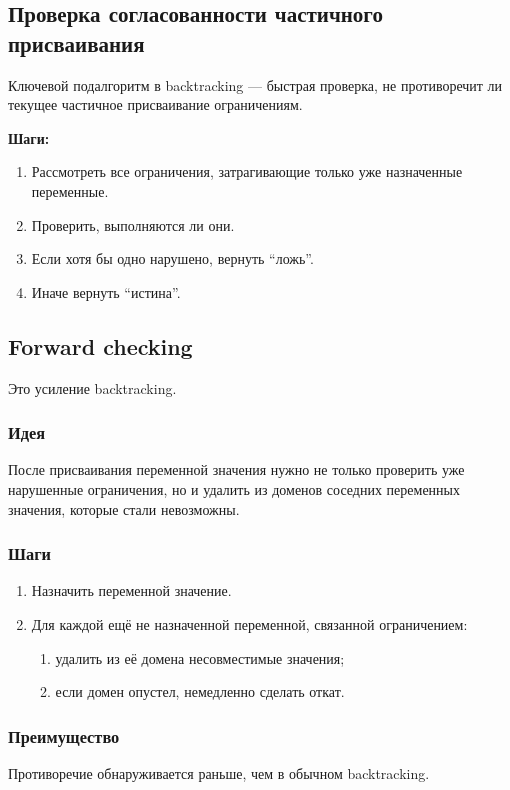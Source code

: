 \documentclass[12pt,a4paper]{article}
\theoremstyle{definition}
\theoremstyle{plain}
\begin{document}
\subsection{Проверка согласованности частичного присваивания}
Ключевой подалгоритм в backtracking --- быстрая проверка, не противоречит ли текущее частичное присваивание ограничениям.

\textbf{Шаги:}
\begin{enumerate}
\item Рассмотреть все ограничения, затрагивающие только уже назначенные переменные.
\item Проверить, выполняются ли они.
\item Если хотя бы одно нарушено, вернуть ``ложь''.
\item Иначе вернуть ``истина''.
\end{enumerate}

\subsection{Forward checking}
Это усиление backtracking.

\subsubsection{Идея}
После присваивания переменной значения нужно не только проверить уже нарушенные ограничения, но и удалить из доменов соседних переменных значения, которые стали невозможны.

\subsubsection{Шаги}
\begin{enumerate}
\item Назначить переменной значение.
\item Для каждой ещё не назначенной переменной, связанной ограничением:
\begin{enumerate}
\item удалить из её домена несовместимые значения;
\item если домен опустел, немедленно сделать откат.
\end{enumerate}
\end{enumerate}

\subsubsection{Преимущество}
Противоречие обнаруживается раньше, чем в обычном backtracking.
\end{document}
